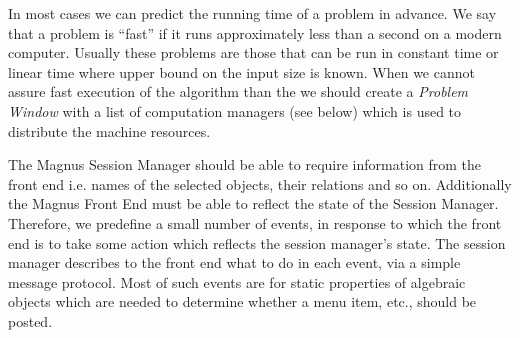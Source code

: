 \documentclass[12pt]{article}
\begin{document}
  In most cases we can predict the running time of a problem in advance.
  We say that a problem is ``fast''  if it runs approximately less than a
  second on a modern computer. Usually these problems are those that
  can be run in constant time or linear time where upper bound on the 
  input size is known. When we cannot assure fast execution of the algorithm
  than the we should create a \emph{Problem Window} with a list of computation
  managers (see below) which is used to distribute the machine resources.


     The Magnus Session Manager should be able to require information from 
  the front end i.e. names of the selected objects, their relations
  and so on.  Additionally the Magnus Front End must be able to reflect the state 
  of the
  Session Manager.  Therefore, we predefine a small number of events, in response 
  to
   which the front end is to take some action which reflects the session manager's
   state. The session manager describes to the front end what to do in each event, 
  via a simple message  protocol. 
  Most of such events  are for static properties of algebraic objects which
    are needed to determine whether a menu item, etc., should be posted.
\end{document}
